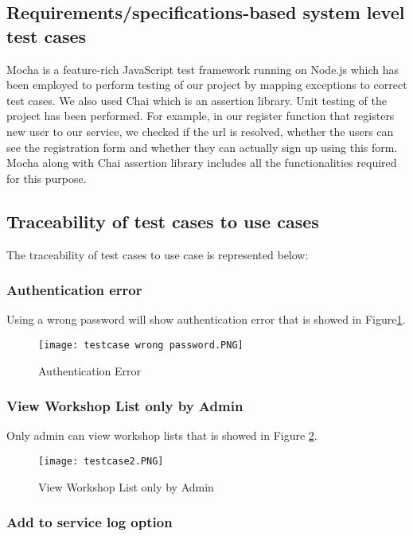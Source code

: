 \documentclass[11pt]{article} %
\begin{document}
	\subsection{Requirements/specifications-based system level test cases}
	Mocha is a feature-rich JavaScript test framework running on Node.js which has been employed to perform testing of our project by mapping exceptions to correct test cases. We also used Chai which is an assertion library. Unit testing of the project has been performed. For example, in our register function that registers new user to our service, we checked if the url is resolved, whether the users can see the registration form and whether they can actually sign up using this form. Mocha along with Chai assertion library includes all the functionalities required for this purpose. 
	\subsection{Traceability of test cases to use cases}
	The traceability of test cases to use case is represented below:\\
    \subsubsection{Authentication error}
    Using a wrong password will show authentication error that is showed in Figure\ref{fig:AE}.
	\begin{figure}[!hbt]
		\centering
        \texttt{[image: testcase wrong password.PNG]} \par
        \caption{Authentication Error}
        \label{fig:AE}
    \end{figure}
    \newpage
    \subsubsection{View Workshop List only by Admin}
    Only admin can view workshop lists that is showed in Figure \ref{fig:ViewAdmin}.
    
	\begin{figure}[!hbt]
		\centering
        \texttt{[image: testcase2.PNG]} \par
        \caption{View Workshop List only by Admin}
        \label{fig:ViewAdmin}
    \end{figure}
    
    \subsubsection{Add to service log option}
    
\end{document}
